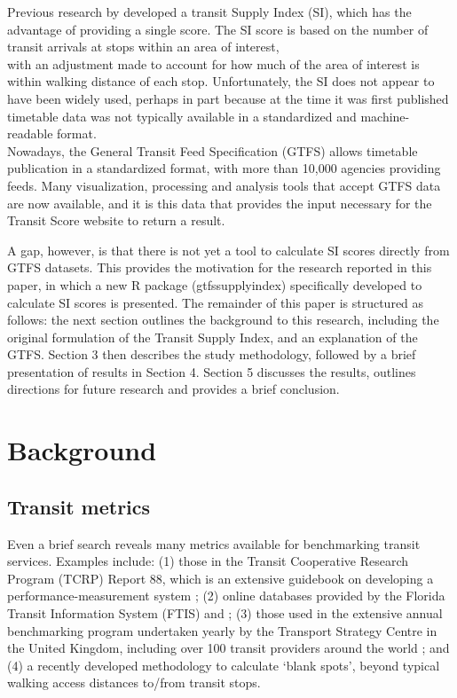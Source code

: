 \documentclass[preprint, 3p,
authoryear]{elsarticle} %
\begin{document}
Previous research by \citet{currie2007identifying} developed a transit
Supply Index (SI), which has the advantage of providing a single score.
The SI score is based on the number of transit arrivals at stops within
an area of interest,\\
with an adjustment made to account for how much of the area of interest
is within walking distance of each stop. Unfortunately, the SI does not
appear to have been widely used, perhaps in part because at the time it
was first published timetable data was not typically available in a
standardized and machine-readable format.\\
Nowadays, the General Transit Feed Specification (GTFS) allows timetable
publication in a standardized format, with more than 10,000 agencies
providing feeds\citep{GTFS}. Many visualization, processing and analysis
tools that accept GTFS data are now available, and it is this data that
provides the input necessary for the Transit Score website to return a
result.

A gap, however, is that there is not yet a tool to calculate SI scores
directly from GTFS datasets. This provides the motivation for the
research reported in this paper, in which a new R package
(gtfssupplyindex) specifically developed to calculate SI scores is
presented. The remainder of this paper is structured as follows: the
next section outlines the background to this research, including the
original formulation of the Transit Supply Index, and an explanation of
the GTFS. Section 3 then describes the study methodology, followed by a
brief presentation of results in Section 4. Section 5 discusses the
results, outlines directions for future research and provides a brief
conclusion.

\hypertarget{background}{%
\section{Background}\label{background}}

\hypertarget{transit-metrics}{%
\subsection{Transit metrics}\label{transit-metrics}}

Even a brief search reveals many metrics available for benchmarking
transit services. Examples include: (1) those in the Transit Cooperative
Research Program (TCRP) Report 88, which is an extensive guidebook on
developing a performance-measurement system \citep{Ryus:2003aa}; (2)
online databases provided by the Florida Transit Information System
(FTIS) \citep{Florida-Transit-Information-System:2018aa} and
\citet{UITP:2015aa}; (3) those used in the extensive annual benchmarking
program undertaken yearly by the Transport Strategy Centre in the United
Kingdom, including over 100 transit providers around the world
\citep{Imperial-College-London:2023aa}; and (4) a recently developed
methodology to calculate `blank spots', beyond typical walking access
distances to/from transit stops\citep{AlamriSultan2023GAoA}.
\end{document}
